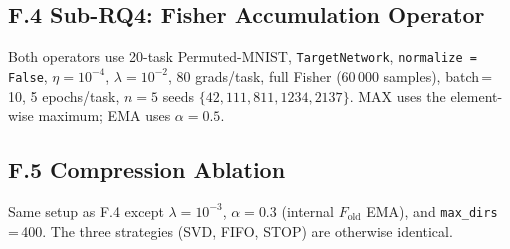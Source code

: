 \subsection*{F.4 \quad Sub-RQ4: Fisher Accumulation Operator}
\label{app:hyperparameters_rq4}

Both operators use 20-task Permuted-MNIST, \texttt{TargetNetwork},
\texttt{normalize = False}, $\eta = 10^{-4}$, $\lambda = 10^{-2}$,
80 grads/task, full Fisher (60\,000 samples), batch\,=\,10, 5 epochs/task,
$n = 5$ seeds $\{42, 111, 811, 1234, 2137\}$.
MAX uses the element-wise maximum; EMA uses $\alpha = 0.5$.

\subsection*{F.5 \quad Compression Ablation}
\label{app:hyperparameters_compression}

Same setup as F.4 except $\lambda = 10^{-3}$, $\alpha = 0.3$ (internal
$F_{\mathrm{old}}$ EMA), and \texttt{max\_dirs}\,=\,400.
The three strategies (SVD, FIFO, STOP) are otherwise identical.
